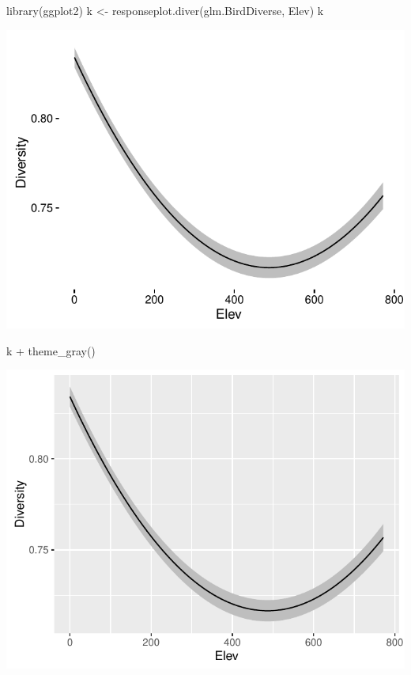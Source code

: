 \documentclass[article]{jss}
\begin{document}
\begin{CodeChunk}
\begin{CodeInput}
library(ggplot2)
k <- responseplot.diver(glm.BirdDiverse, Elev)
k
\end{CodeInput}


\begin{center}\includegraphics{diversityocc_files/figure-latex/unnamed-chunk-20-1} \end{center}

\begin{CodeInput}
k + theme_gray()
\end{CodeInput}


\begin{center}\includegraphics{diversityocc_files/figure-latex/unnamed-chunk-20-2} \end{center}


\end{CodeChunk}
\end{document}
